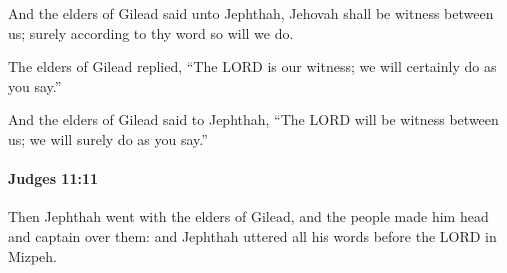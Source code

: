 			\begin{versebox}
					\item[BHS] 
					\item[ASV] And the elders of Gilead said unto Jephthah, Jehovah shall be witness between us; surely according to thy word so will we do.
					\item[NIV] The elders of Gilead replied, “The LORD is our witness; we will certainly do as you say.”
					\item[NRSV] And the elders of Gilead said to Jephthah, “The LORD will be witness between us; we will surely do as you say.”
			\end{versebox}

		\paragraph{Judges 11:11} %
			\label{JUDGES-11-11}

			Then Jephthah went with the elders of Gilead, and the people made him head and captain over them: and Jephthah uttered all his words before the LORD in Mizpeh.

